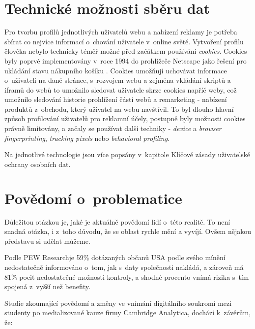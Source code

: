 
\section{Technické možnosti sběru dat}

Pro tvorbu profilů jednotlivých uživatelů webu a nabízení reklamy je potřeba sbírat co nejvíce informací o~chování uživatele v~online světě. Vytvoření profilu člověka nebylo technicky téměř možné před začátkem používání \textit{cookies}.
Cookies byly poprvé implementovány v~roce 1994 do prohlížeče Netscape jako řešení pro ukládání stavu nákupního košíku \citep{cookies-history}. Cookies umožňují uchovávat informace o~uživateli na dané stránce, s~rozvojem webu a zejména vkládání skriptů a iframů do webů to umožnilo sledovat uživatele skrze cookies napříč weby, což umožnilo sledování historie prohlížení části webů a remarketing - nabízení produktů z~obchodu, který uživatel na webu navštívil\citep{scott-cookies}. To byl dlouho hlavní způsob profilování uživatelů pro reklamní účely, postupně byly možnosti cookies právně limitovány, a začaly se používat další techniky - \textit{device} a \textit{browser fingerprinting}, \textit{tracking pixels} nebo \textit{behavioral profiling}.

Na jednotlivé technologie jsou více popsány v~kapitole Klíčové zásady uživatelské ochrany osobních dat.

\section{Povědomí o~problematice}

Důležitou otázkou je, jaké je aktuálně povědomí lidí o~této realitě. To není snadná otázka, i z~toho důvodu, že se oblast rychle mění a vyvíjí. Ovšem nějakou představu si udělat můžeme.

Podle PEW Researchje 59\% dotázaných občanů USA podle svého mínění nedostatečně informováno o~tom, jak s~daty společnosti nakládá, a zároveň má 81\% pocit nedostatečné možnosti kontroly, a shodné procento vnímá rizika s~tím spojená z~vyšší než benefity.\citep{lack-of-control}

Studie\citep{privacy-awareness} zkoumající povědomí a změny ve vnímání digitálního soukromí mezi studenty po medializované kauze firmy Cambridge Analytica, dochází k~závěrům, že:

